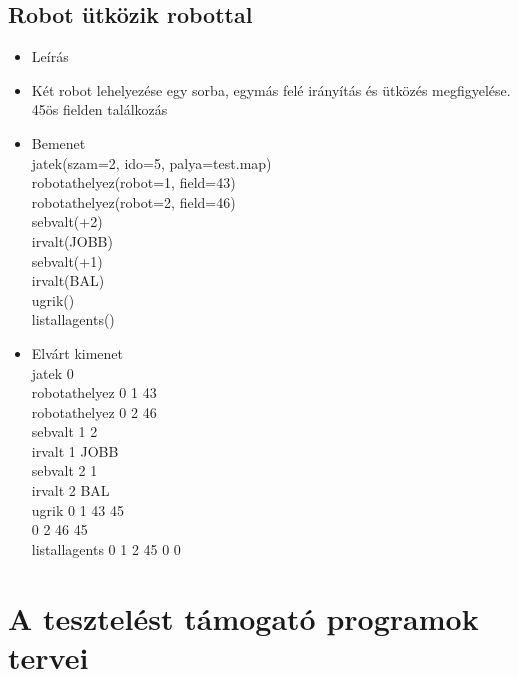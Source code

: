 \subsection{Robot ütközik robottal}
\begin{itemize}
	\item Leírás\\
	\item Két robot lehelyezése egy sorba, egymás felé irányítás és ütközés megfigyelése. 45ös fielden találkozás
	\item Bemenet\\
		jatek(szam=2, ido=5, palya=test.map) \\
		robotathelyez(robot=1, field=43) \\
		robotathelyez(robot=2, field=46) \\	
		sebvalt(+2) \\
		irvalt(JOBB) \\
		sebvalt(+1) \\
		irvalt(BAL) \\
		ugrik() \\
		listallagents() \\
	\item Elvárt kimenet\\
		jatek 0 \\ 
		robotathelyez 0 1 43 \\		
		robotathelyez 0 2 46 \\		
		sebvalt 1 2 \\
		irvalt 1 JOBB \\
		sebvalt 2 1 \\
		irvalt 2 BAL \\		
		ugrik 0 1 43 45 \\ 
	  		  0 2 46 45 \\ 
		listallagents 0 1 2 45 0 0 \\
\end{itemize}

\section{A tesztelést támogató programok tervei}

